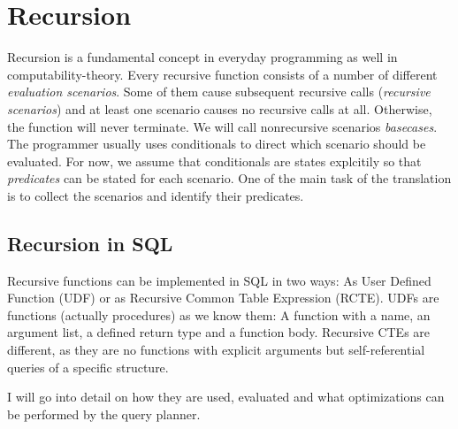 

\section{Recursion}

Recursion is a fundamental concept in everyday programming as well in computability-theory. Every recursive function consists of a number of different \textit{evaluation scenarios}. Some of them cause subsequent recursive calls (\textit{recursive scenarios}) and at least one scenario causes no recursive calls at all. Otherwise, the function will never terminate. We will call nonrecursive scenarios \textit{basecases}. The programmer usually uses conditionals to direct which scenario should be evaluated. For now, we assume that conditionals are states explcitily so that \textit{predicates} can be stated for each scenario. One of the main task of the translation is to collect the scenarios and identify their predicates.

\subsection{Recursion in SQL}

Recursive functions can be implemented in SQL in two ways: As User Defined Function (UDF) or as Recursive Common Table Expression (RCTE). UDFs are functions (actually procedures) as we know them: A function with a name, an argument list, a defined return type and a function body. Recursive CTEs are different, as they are no functions with explicit arguments but self-referential queries of a specific structure.

I will go into detail on how they are used, evaluated and what optimizations can be performed by the query planner.

